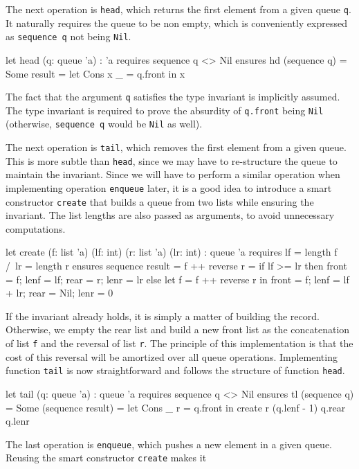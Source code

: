 The next operation is \texttt{head}, which returns the first element from
a given queue \texttt{q}. It naturally requires the queue to be non
empty, which is conveniently expressed as \texttt{sequence q} not
being \texttt{Nil}.
\begin{whycode}
  let head (q: queue 'a) : 'a
    requires { sequence q <> Nil }
    ensures  { hd (sequence q) = Some result }
  = let Cons x _ = q.front in x
\end{whycode}
The fact that the argument \texttt{q} satisfies the type invariant is
implicitly assumed. The type invariant is
required to prove the absurdity of
\texttt{q.front} being \texttt{Nil}
(otherwise, \texttt{sequence q} would be \texttt{Nil} as well).

The next operation is \texttt{tail}, which removes the first element
from a given queue. This is more subtle than \texttt{head}, since we
may have to re-structure the queue to maintain the invariant.
Since we will have to perform a similar operation when implementing
operation \texttt{enqueue} later, it is a good idea to introduce a smart
constructor \texttt{create} that builds a queue from two lists while
ensuring the invariant. The list lengths are also passed as arguments,
to avoid unnecessary computations.
\begin{whycode}
  let create (f: list 'a) (lf: int) (r: list 'a) (lr: int) : queue 'a
    requires { lf = length f /\ lr = length r }
    ensures  { sequence result = f ++ reverse r }
  = if lf >= lr then
      { front = f; lenf = lf; rear = r; lenr = lr }
    else
      let f = f ++ reverse r in
      { front = f; lenf = lf + lr; rear = Nil; lenr = 0 }
\end{whycode}
If the invariant already holds, it is simply a matter of building the
record. Otherwise, we empty the rear list and build a new front list
as the concatenation of list \texttt{f} and the reversal of list \texttt{r}.
The principle of this implementation is that the cost of this reversal
will be amortized over all queue operations. Implementing function
\texttt{tail} is now straightforward and follows the structure of
function \texttt{head}.
\begin{whycode}
  let tail (q: queue 'a) : queue 'a
    requires { sequence q <> Nil }
    ensures  { tl (sequence q) = Some (sequence result) }
  = let Cons _ r = q.front in
    create r (q.lenf - 1) q.rear q.lenr
\end{whycode}
The last operation is \texttt{enqueue}, which pushes a new element in
a given queue. Reusing the smart constructor \texttt{create} makes it
